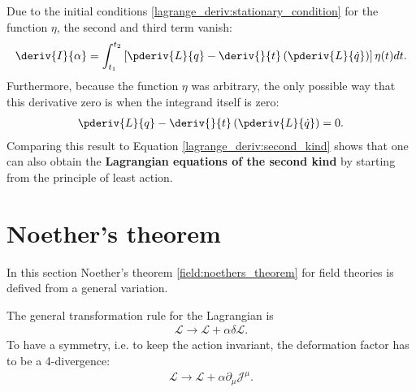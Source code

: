     Due to the initial conditions \eqref{lagrange_deriv:stationary_condition} for the function $\eta$, the second and third term vanish:
    \begin{gather}
        \label{lagrange_deriv:final_integral}
        \deriv{I}{\alpha}=\int_{t_1}^{t_2}\left[\pderiv{L}{q} - \deriv{}{t}\left(\pderiv{L}{\dot{q}}\right)\right]\eta(t)dt.
    \end{gather}
    Furthermore, because the function $\eta$ was arbitrary, the only possible way that this derivative zero is when the integrand itself is zero:
    \begin{gather}
        \label{lagrange_deriv:second_kind_with_hamilton}
        \pderiv{L}{q} - \deriv{}{t}\left(\pderiv{L}{\dot{q}}\right) = 0.
    \end{gather}
    Comparing this result to Equation \eqref{lagrange_deriv:second_kind} shows that one can also obtain the \textbf{Lagrangian equations of the second kind} by starting from the principle of least action.

\section{Noether's theorem}\label{proof:noether}

    In this section Noether's theorem \ref{field:noethers_theorem} for field theories is defived from a general variation.

    The general transformation rule for the Lagrangian is
    \begin{gather}
        \label{noether_deriv:1}
        \mathcal{L}\longrightarrow\mathcal{L} + \alpha\delta\mathcal{L}.
    \end{gather}
    To have a symmetry, i.e. to keep the action invariant, the deformation factor has to be a 4-divergence:
    \begin{gather}
        \label{noether_deriv:2}
        \mathcal{L}\longrightarrow\mathcal{L} + \alpha\partial_\mu\mathcal{J}^\mu.
    \end{gather}

